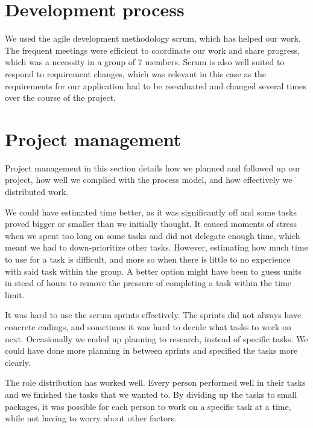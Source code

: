 \section{Development process}

We used the agile development methodology scrum, which has helped our work. The frequent meetings were efficient to coordinate our work and share progress, which was a necessity in a group of 7 members. Scrum is also well suited to respond to requirement changes, which was relevant in this case as the requirements for our application had to be reevaluated and changed several times over the course of the project.

\section{Project management}

Project management in this section details how we planned and followed up our project, how well we complied with the process model, and how effectively we distributed work.\newline

We could have estimated time better, as it was significantly off and some tasks proved bigger or smaller than we initially thought. It caused moments of stress when we spent too long on some tasks and did not delegate enough time, which meant we had to down-prioritize other tasks. However, estimating how much time to use for a task is difficult, and more so when there is little to no experience with said task within the group. A better option might have been to guess units in stead of hours to remove the pressure of completing a task within the time limit.\newline

It was hard to use the scrum sprints effectively. The sprints did not always have concrete endings, and sometimes it was hard to decide what tasks to work on next. Occasionally we ended up planning to research, instead of specific tasks. We could have done more planning in between sprints and specified the tasks more clearly.\newline

The role distribution has worked well. Every person performed well in their tasks and we finished the tasks that we wanted to. By dividing up the tasks to small packages, it was possible for each person to work on a specific task at a time, while not having to worry about other factors.\newline

